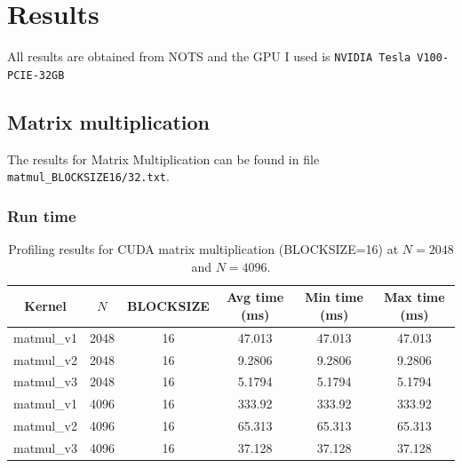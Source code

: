 \documentclass[11pt]{article}
\begin{document}
\newpage

\section{Results}
All results are obtained from NOTS and the GPU I used is \verb|NVIDIA Tesla V100-PCIE-32GB|

\subsection{Matrix multiplication}
The results for Matrix Multiplication can be found in file \verb|matmul_BLOCKSIZE16/32.txt|.
\subsubsection{Run time}
\begin{table}[H]
\centering
\begin{tabular}{|c|c|c|c|c|c|}
\hline
\textbf{Kernel}   & \boldmath$N$\unboldmath & \textbf{BLOCKSIZE} & \textbf{Avg time (ms)} & \textbf{Min time (ms)} & \textbf{Max time (ms)} \\ \hline
matmul\_v1        & 2048  & 16  & 47.013  & 47.013  & 47.013  \\
matmul\_v2        & 2048  & 16  & 9.2806  & 9.2806  & 9.2806  \\
matmul\_v3        & 2048  & 16  & 5.1794  & 5.1794  & 5.1794  \\ \hline
matmul\_v1        & 4096  & 16  & 333.92  & 333.92  & 333.92  \\
matmul\_v2        & 4096  & 16  & 65.313  & 65.313  & 65.313  \\
matmul\_v3        & 4096  & 16  & 37.128  & 37.128  & 37.128  \\ \hline
\end{tabular}
\caption{Profiling results for CUDA matrix multiplication (BLOCKSIZE=16) at $N=2048$ and $N=4096$.}
\label{tab:matmul_combined_updated}
\end{table}
\end{document}
